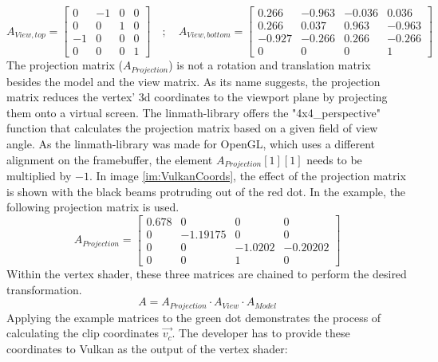 \begin{equation*}
    A_{View, top} = 
\begin{bmatrix}
    0 & -1& 0 & 0 \\
    0 & 0 & 1 & 0 \\
    -1 & 0 & 0 & 0 \\
    0 & 0 & 0 & 1
\end{bmatrix} \quad ; \quad
    A_{View, bottom} =
\begin{bmatrix}
    0.266 &-0.963 & -0.036 & 0.036 \\
    0.266 & 0.037 & 0.963 & -0.963 \\
    -0.927 &-0.266 & 0.266 & -0.266 \\
    0 & 0 & 0 & 1
\end{bmatrix}
\end{equation*}
The projection matrix ($A_{Projection}$)  is not a rotation and translation matrix besides the model and the view matrix. As its name suggests, the projection matrix reduces the vertex' 3d coordinates to the viewport plane by projecting them onto a virtual screen. The linmath-library offers the "4x4\_perspective" function that calculates the projection matrix based on a given field of view angle. As the linmath-library was made for OpenGL, which uses a different alignment on the framebuffer, the element $A_{Projection}[1][1]$ needs to be multiplied by $-1$. In image \ref{im:VulkanCoords}, the effect of the projection matrix is shown with the black beams protruding out of the red dot. In the example, the following projection matrix is used.
\begin{equation*}
    A_{Projection} =
\begin{bmatrix}
    0.678 & 0 & 0 & 0 \\
    0 & -1.19175 & 0 & 0 \\
    0 & 0 & -1.0202 & -0.20202 \\
    0 & 0 & 1 & 0
\end{bmatrix}
\end{equation*}
Within the vertex shader, these three matrices are chained to perform the desired transformation.
\begin{equation*}
    A = A_{Projection} \cdot A_{View} \cdot A_{Model}
\end{equation*}
Applying the example matrices to the green dot demonstrates the process of calculating the clip coordinates $\vec{v_{c}}$. The developer has to provide these coordinates to Vulkan as the output of the vertex shader:
